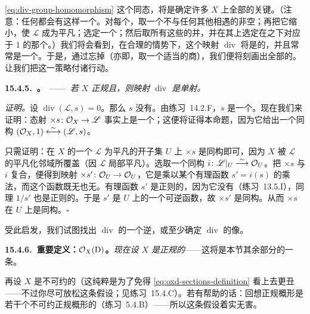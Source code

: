 \eqref{eq:div-group-homomorphism} 这个同态，将是确定许多 $X$ 上全部\trLineBundle{}的关键。（注意：任何\trInvertibleSheaf{}都会有这样一个\trRational\trSection。对每个\trIrreducibleComponent{}，取一个不与任何其他\trIrreducibleComponent{}相遇的非空\trOpenSet；再把它缩小，使 $\mathscr{L}$ 成为平凡；选定一个\trTrivialization；然后取所有这些\trOpenSet{}的并，并在其上选定在\trTrivialization{}之下对应于 $1$ 的那个\trSection。）我们将会看到，在合理的情势下，这个映射 $\operatorname{div}$ 将是\trInjectiveMap{}的，并且常常是一个\trIsomorphism。于是，通过忘掉\trRational\trSection（亦即，取一个适当的商），我们便将刻画出全部\trLineBundle{}的\trPicardGroup。让我们把这一策略付诸行动。

\textbf{15.4.5.\ \trhProposition{}。}\ ——\ \emph{若 $X$ 正规且\trNoetherian，则映射 $\operatorname{div}$ 是单射。}

\emph{证明。}\quad 设 $\operatorname{div}(\mathscr{L},s)=0$。那么 $s$ 没有\trPole。由\mbox{练习~14.2.F}，$s$ 是一个\trRegular\trSection。现在我们来证明：态射 $\times s\colon\mathcal{O}_X\to\mathscr{L}$ 事实上是一个\trIsomorphism；这便将证得本命题，因为它给出一个同构 $(\mathcal{O}_X,1)\overset{\sim}{\longleftrightarrow}(\mathscr{L},s)$。

只需证明：在 $X$ 的一个 $\mathscr{L}$ 为平凡的开子集 $U$ 上 $\times s$ 是同构即可，因为 $X$ 被 $\mathscr{L}$ 的平凡化邻域所覆盖（因 $\mathscr{L}$ 局部平凡）。选取一个同构 $i\colon\mathscr{L}\vert_U\overset{\sim}{\longrightarrow}\mathcal{O}_U$。把 $\times s$ 与 $i$ 复合，便得到映射 $\times s'\colon\mathcal{O}_U\to\mathcal{O}_U$，它是乘以某个有理函数 $s'=i(s)$ 的乘法，而这个函数既无\trZeros{}也无\trPole。有理函数 $s'$ 是正则的，因为它没有\trPole（\mbox{练习~13.5.I}），同理 $1/s'$ 也是正则的。于是 $s'$ 是 $U$ 上的一个可逆函数，故 $\times s'$ 是同构。从而 $\times s$ 在 $U$ 上是同构。\hfill$\square$

受此启发，我们试图找出 $\operatorname{div}$ 的一个逆，或至少确定 $\operatorname{div}$ 的像。

\textbf{15.4.6.\ 重要定义：$\mathcal{O}_X(\mathrm{D})$。}\quad \emph{现在设 $X$ 是正规的}——这将是本节其余部分的一条\trStandingHypothesis。

再设 $X$ 是不可约的（这纯粹是为了免得 \eqref{eq:oxd-sections-definition} 看上去更丑——不过你尽可放松这条假设；见\mbox{练习~15.4.C}）。若有帮助的话：回想正规概形是若干个不可约正规概形的\trDisjointUnion（\mbox{练习~5.4.B}）——所以这条假设着实无害。

